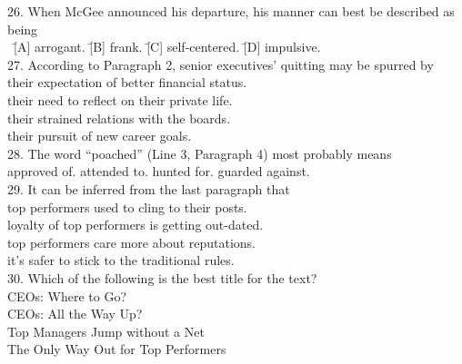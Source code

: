 \begin{tabbing}
26. When McGee announced his departure, his manner can best be described as being\\
\hspace{0cm}\ \= [A] arrogant. \quad\quad\quad\quad\quad\= [B] frank.
\quad\quad\quad\quad\quad\= [C] self-centered.
\quad\quad\quad\quad\quad\= [D] impulsive.\\

27. According to Paragraph 2, senior executives’ quitting may be spurred by\\
\> [A] their expectation of better financial status.\\
\> [B] their need to reflect on their private life.\\
\> [C] their strained relations with the boards.\\
\> [D] their pursuit of new career goals.\\

28. The word ``poached'' (Line 3, Paragraph 4) most probably means\\
\> [A] approved of.
\> [B] attended to.
\> [C] hunted for.
\> [D] guarded against. \\

29. It can be inferred from the last paragraph that\\
\> [A] top performers used to cling to their posts.\\
\> [B] loyalty of top performers is getting out-dated.\\
\> [C] top performers care more about reputations.\\
\> [D] it’s safer to stick to the traditional rules.\\

30. Which of the following is the best title for the text?\\
\> [A] CEOs: Where to Go?\\
\> [B] CEOs: All the Way Up?\\
\> [C] Top Managers Jump without a Net\\
\> [D] The Only Way Out for Top Performers
\end{tabbing}